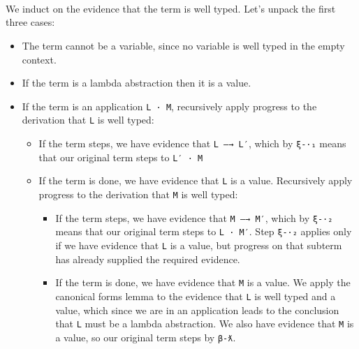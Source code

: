 \begin{fence}
\begin{code}
\AgdaSpace{}%
\<%
\\
\>[0]%
\>[6]\AgdaSymbol{|}\AgdaSpace{}%
%
\>[44]\AgdaSymbol{=}%
\>[47]\AgdaSpace{}%
\<%
\\
\>[0]%
\>[6]\AgdaSymbol{|}\AgdaSpace{}%
\AgdaSpace{}%
%
\>[44]\AgdaSymbol{=}%
\>[47]\AgdaSpace{}%
\AgdaSymbol{(}\AgdaSpace{}%
\AgdaSymbol{(}\AgdaSpace{}%
\AgdaSymbol{))}\<%
\\
\>[0]\AgdaSpace{}%
\AgdaSymbol{(}\AgdaSpace{}%
\AgdaSymbol{)}%
\>[44]\AgdaSymbol{=}%
\>[47]\AgdaSpace{}%
\<%
\end{code}
\end{fence}

We induct on the evidence that the term is well typed. Let's unpack the
first three cases:

\begin{itemize}
\item
  The term cannot be a variable, since no variable is well typed in the
  empty context.
\item
  If the term is a lambda abstraction then it is a value.
\item
  If the term is an application \texttt{L\ ·\ M}, recursively apply
  progress to the derivation that \texttt{L} is well typed:

  \begin{itemize}
  \item
    If the term steps, we have evidence that \texttt{L\ —→\ L′}, which
    by \texttt{ξ-·₁} means that our original term steps to
    \texttt{L′\ ·\ M}
  \item
    If the term is done, we have evidence that \texttt{L} is a value.
    Recursively apply progress to the derivation that \texttt{M} is well
    typed:

    \begin{itemize}
    \item
      If the term steps, we have evidence that \texttt{M\ —→\ M′}, which
      by \texttt{ξ-·₂} means that our original term steps to
      \texttt{L\ ·\ M′}. Step \texttt{ξ-·₂} applies only if we have
      evidence that \texttt{L} is a value, but progress on that subterm
      has already supplied the required evidence.
    \item
      If the term is done, we have evidence that \texttt{M} is a value.
      We apply the canonical forms lemma to the evidence that \texttt{L}
      is well typed and a value, which since we are in an application
      leads to the conclusion that \texttt{L} must be a lambda
      abstraction. We also have evidence that \texttt{M} is a value, so
      our original term steps by \texttt{β-ƛ}.
    \end{itemize}
  \end{itemize}
\end{itemize}

